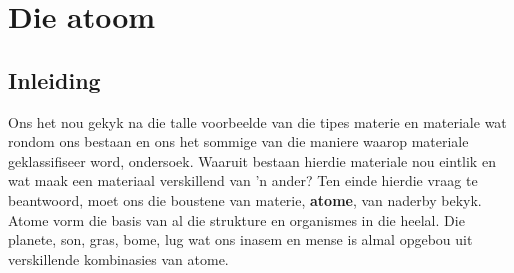          \chapter{Die atoom}
\label{chap:atom}
    \label{ea1c9e59656f96ee804546971cf6dee6}
    \label{m38756*cid1}
            \section{Inleiding}
            \nopagebreak 
Ons het nou gekyk na die talle voorbeelde van die tipes materie en materiale wat rondom ons bestaan
en ons het sommige van die maniere waarop materiale geklassifiseer word, ondersoek. Waaruit bestaan hierdie materiale nou eintlik en wat maak een materiaal verskillend van 'n ander? Ten einde hierdie vraag te beantwoord, moet ons die boustene van materie, \textbf{atome}, van naderby bekyk. Atome vorm die basis van al die strukture en organismes in die heelal. Die planete, son, gras, bome, lug wat ons inasem en mense is almal opgebou uit verskillende kombinasies van atome.\par 
            




